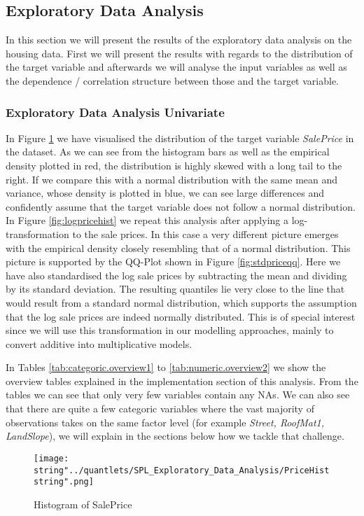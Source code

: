 \subsection{Exploratory Data Analysis}
In this section we will present the results of the exploratory data analysis on the housing data. First we will present the results with regards to the distribution of the target variable and afterwards we will analyse the input variables as well as the dependence / correlation structure between those and the target variable. 
\subsubsection{Exploratory Data Analysis Univariate}
In Figure \ref{fig:pricehist} we have visualised the distribution of the target variable \textit{SalePrice} in the dataset. As we can see from the histogram bars as well as the empirical density plotted in red, the distribution is highly skewed with a long tail to the right. If we compare this with a normal distribution with the same mean and variance, whose density is plotted in blue, we can see large differences and confidently assume that the target variable does not follow a normal distribution. 
In Figure \ref{fig:logpricehist} we repeat this analysis after applying a log-transformation to the sale prices. In this case a very different picture emerges with the empirical density closely resembling that of a normal distribution. This picture is supported by the QQ-Plot shown in Figure \ref{fig:stdpriceqq}. Here we have also standardised the log sale prices by subtracting the mean and dividing by its standard deviation. The resulting quantiles lie very close to the line that would result from a standard normal distribution, which supports the assumption that the log sale prices are indeed normally distributed. This is of special interest since we will use this transformation in our modelling approaches, mainly to convert additive into multiplicative models. 

In Tables \ref{tab:categoric.overview1} to \ref{tab:numeric.overview2} we show the overview tables explained in the implementation section of this analysis. From the tables we can see that only very few variables contain any NAs. We can also see that there are quite a few categoric variables where the vast majority of observations takes on the same factor level (for example \textit{Street, RoofMat1, LandSlope}), we will explain in the sections below how we tackle that challenge.

\begin{figure}[H]
  \centering
\texttt{[image: \\string"../quantlets/SPL\_Exploratory\_Data\_Analysis/PriceHist\\string".png]}
  \caption{Histogram of SalePrice}\label{fig:pricehist}
\end{figure}

